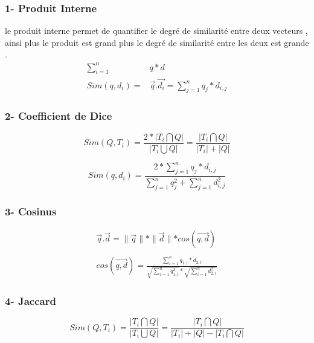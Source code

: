 \documentclass[12pt,a4paper,oneside]{article}
\begin{document}
\subsubsection*{\hspace{1cm}1-	Produit Interne} 
le produit interne permet de quantifier
le degré de similarité entre deux vecteurs , ainsi plus le produit est grand plus le degré de similarité entre les deux est grande .
\begin{equation*}
\begin{split}
\sum_{i=1}^{n} & q*d\\
Sim(q,d_i) =& \vec{q} . \vec{d_i} = \sum_{j=1}^{n} q_j * d_{i,j}
\end{split}
\end{equation*}

\subsubsection*{\hspace{1cm}2-	Coefficient de Dice} 
\begin{equation*}
Sim(Q,T_i) = \frac{2*|T_i \bigcap Q|}{|T_i \bigcup Q|} = \frac{|T_i \bigcap Q|}{|T_i|+|Q|}
\end{equation*}

\[
Sim(q,d_i) = \frac{2*\sum_{j=1}^{n} q_{j} * d_{i,j}}
{\sum_{j=1}^{n} q_{j}^2 + \sum_{j=1}^{n} d_{i,j}^2 }
\]

\subsubsection*{\hspace{1cm}3-	Cosinus} 
\begin{equation*}
\begin{gathered}
\vec{q}.\vec{d} = \parallel \vec{q}\parallel * \parallel \vec{d} \parallel  * cos(\overrightarrow{q,d}) \\\\
cos(\overrightarrow{q,d}) = \frac{\sum_{i=1}^{n} q_{1,i} * d_{2,i} }
{\sqrt{\sum_{i=1}^{n} q_{1,i}^2} * \sqrt{\sum_{i=1}^{n} d_{2,i}^2} }
\end{gathered}
\end{equation*}
\subsubsection*{\hspace{1cm}4-	Jaccard} 
\[
Sim(Q,T_i) = \frac{|T_i \bigcap Q|}{|T_i \bigcup Q|} = \frac{|T_i \bigcap Q|}{|T_i|+|Q|-|T_i \bigcap Q|}
\]
\end{document}

